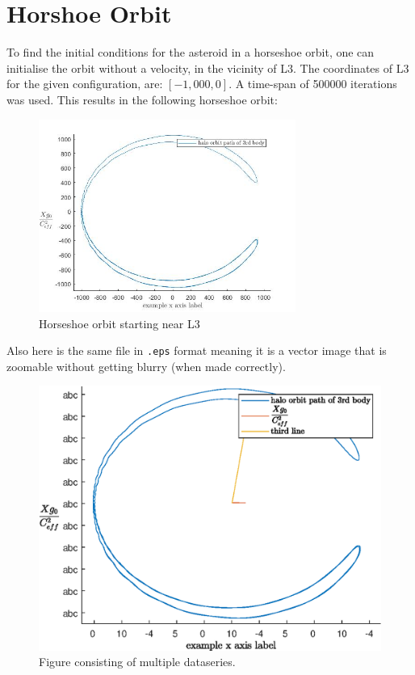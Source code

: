 \section{Horshoe Orbit}\label{sec:3}
To find the initial conditions for the asteroid in a horseshoe orbit, one can initialise the orbit without a velocity, in the vicinity of L3. The coordinates of L3 for the given configuration, are: $[-1,000, 0]$\cite{lecture_notes}.
A time-span of 500000 iterations was used. This results in the following horseshoe orbit:
\begin{figure}[H]
    \centering
    \includegraphics[width=0.75\textwidth]{Images/plot_1d.jpg}
    \caption{Horseshoe orbit starting near L3}
\end{figure}
Also here is the same file in \verb+.eps+ format meaning it is a vector image that is zoomable without getting blurry (when made correctly).
\begin{figure}[H]
    \centering
    \includegraphics[width=1\textwidth]{Images/plot_1d.eps}
    \caption{Figure consisting of multiple dataseries.}
\end{figure}
